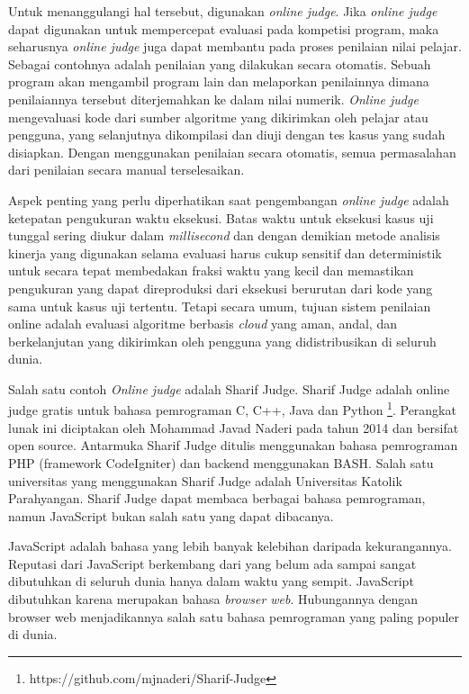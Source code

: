 \documentclass[a4paper,twoside]{article}
\begin{document}
Untuk menanggulangi hal tersebut, digunakan \textit{online judge}\cite{online_judge2001}. Jika \textit{online judge} dapat digunakan untuk mempercepat evaluasi pada kompetisi program, maka seharusnya \textit{online judge} juga dapat membantu pada proses penilaian nilai pelajar. Sebagai contohnya adalah penilaian yang dilakukan secara otomatis. Sebuah program akan mengambil program lain dan melaporkan penilainnya dimana penilaiannya tersebut diterjemahkan ke dalam nilai numerik. \textit{Online judge} mengevaluasi kode dari sumber algoritme yang dikirimkan oleh pelajar atau pengguna, yang selanjutnya dikompilasi dan diuji dengan tes kasus yang sudah disiapkan. Dengan menggunakan penilaian secara otomatis, semua permasalahan dari penilaian secara manual terselesaikan.

Aspek penting yang perlu diperhatikan saat pengembangan \textit{online judge} adalah ketepatan pengukuran waktu eksekusi\cite{judge_survey2018}. Batas waktu untuk eksekusi kasus uji tunggal sering diukur dalam \textit{millisecond} dan dengan demikian metode analisis kinerja yang digunakan selama evaluasi harus cukup sensitif dan deterministik untuk secara tepat membedakan fraksi waktu yang kecil dan memastikan pengukuran yang dapat direproduksi dari eksekusi berurutan dari kode yang sama untuk kasus uji tertentu. Tetapi secara umum, tujuan sistem penilaian online adalah evaluasi algoritme berbasis \textit{cloud} yang aman, andal, dan berkelanjutan yang dikirimkan oleh pengguna yang didistribusikan di seluruh dunia. 

Salah satu contoh \textit{Online judge} adalah Sharif Judge. Sharif Judge adalah online judge gratis untuk bahasa pemrograman C, C++, Java dan Python \footnote{https://github.com/mjnaderi/Sharif-Judge}. Perangkat lunak ini diciptakan oleh Mohammad Javad Naderi pada tahun 2014 dan bersifat open source. Antarmuka Sharif Judge ditulis menggunakan bahasa pemrograman PHP (framework CodeIgniter) dan backend menggunakan BASH. Salah satu universitas yang menggunakan Sharif Judge adalah Universitas Katolik Parahyangan. Sharif Judge dapat membaca berbagai bahasa pemrograman, namun JavaScript bukan salah satu yang dapat dibacanya.

JavaScript adalah bahasa yang lebih banyak kelebihan daripada kekurangannya\cite{javascript101}. Reputasi dari JavaScript berkembang dari yang belum ada sampai sangat dibutuhkan di seluruh dunia hanya dalam waktu yang sempit. JavaScript dibutuhkan karena merupakan bahasa \textit{browser web}. Hubungannya dengan browser web menjadikannya salah satu bahasa pemrograman yang paling populer di dunia.
\end{document}
